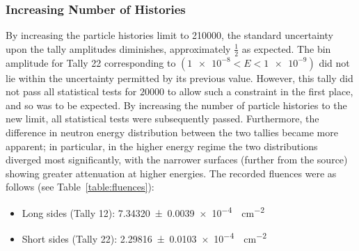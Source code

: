 \documentclass{article}
\begin{document}
    \subsubsection{Increasing Number of Histories}
      By increasing the particle histories limit to \num{210000}, the standard uncertainty upon the tally amplitudes diminishes, approximately $\frac{1}{2}$ as expected. The bin amplitude for Tally 22 corresponding to $(\num{1e-8} < E <\num{1e-9})$ did not lie within the uncertainty permitted by its previous value. However, this tally did not pass all statistical tests for $20000$ to allow such a constraint in the first place, and so was to be expected. By increasing the number of particle histories to the new limit, all statistical tests were subsequently passed. Furthermore, the difference in neutron energy distribution between the two tallies became more apparent; in particular, in the higher energy regime the two distributions diverged most significantly, with the narrower surfaces (further from the source) showing greater attenuation at higher energies.
      The recorded fluences were as follows (see Table~\ref{table:fluences}):
      \begin{itemize}
          \item Long sides (Tally 12): \SI{7.34320\pm 0.0039e-4}{\neutron\per\cm^2}
          \item Short sides (Tally 22): \SI{2.29816\pm 0.0103e-4}{\neutron\per\cm^2}
      \end{itemize}
\end{document}
